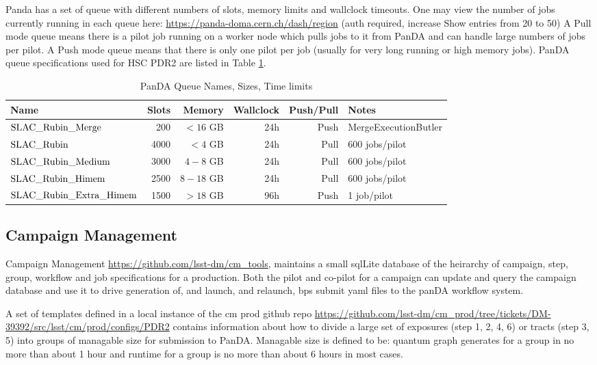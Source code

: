 Panda has a set of queue with different numbers of slots, memory limits and wallclock timeouts. 
One may view the number of jobs currently running in each queue here:
\url{https://panda-doma.cern.ch/dash/region} (auth required, increase Show entries from 20 to 50)
A Pull mode queue means there is a pilot job running on a worker node which pulls jobs to it from PanDA and
can handle large numbers of jobs per pilot.  A Push mode queue means that there is only one pilot per
job (usually for very long running or high memory jobs).   PanDA queue specifications used for
HSC PDR2 are listed in Table \ref{tab:pandaqueues}.

\normalsize 
\begin{center}
\begin{longtable}{|l|r|r|r|r|l|}
\caption{PanDA Queue Names, Sizes, Time limits} \label{tab:pandaqueues}\\
\hline 
\textbf{Name}&\textbf{Slots}&\textbf{Memory}&\textbf{Wallclock}&\textbf{Push/Pull}&\textbf{Notes} \\ 
\hline
$\rm SLAC\_Rubin\_Merge$ & 200 & $<16$ GB & 24h & Push & MergeExecutionButler \\
$\rm SLAC\_Rubin$ & 4000 & $<4$ GB & 24h & Pull & 600 jobs/pilot \\
$\rm SLAC\_Rubin\_Medium$ & 3000 & $4-8$ GB & 24h & Pull &  600 jobs/pilot\\
$\rm SLAC\_Rubin\_Himem$ & 2500& $8-18$ GB & 24h & Pull &  600 jobs/pilot \\
$\rm SLAC\_Rubin\_Extra\_Himem$ & 1500 & $>18$ GB & 96h & Push & 1 job/pilot \\
\hline
\end{longtable} 
\end{center}
\normalsize

\subsection{Campaign Management}

Campaign Management \url{https://github.com/lsst-dm/cm_tools}, maintains a small sqlLite 
database of the heirarchy of campaign, step, group, workflow and job specifications for a production.
Both the pilot and co-pilot for a campaign can update and query the campaign database and use it to
drive generation of, and launch, and relaunch, bps submit yaml files to the panDA workflow system.

A set of templates defined in a local instance of the cm prod 
github repo \url{https://github.com/lsst-dm/cm_prod/tree/tickets/DM-39392/src/lsst/cm/prod/configs/PDR2} contains information about how to divide a large set of
exposures (step 1, 2, 4, 6) or tracts (step 3, 5) into groups of managable size for submission to PanDA.
Managable size is defined to be: quantum graph generates for a group in no more than about 1 hour and runtime
for a group is no more than about 6 hours in most cases.

